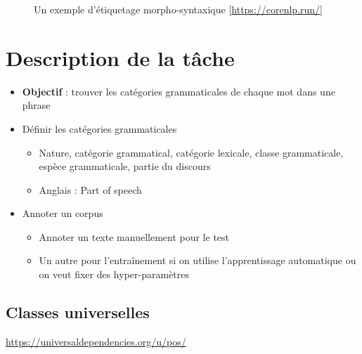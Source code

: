 \documentclass{KodeBook}
\begin{document}
\begin{figure}
	\centering
	\caption{Un exemple d'étiquetage morpho-syntaxique [\url{https://corenlp.run/}]}
\end{figure}

\section{Description de la tâche}

\begin{itemize}
	\item \textbf{Objectif} : trouver les catégories grammaticales de chaque mot dans une phrase
	\item Définir les catégories grammaticales
	\begin{itemize}
		\item Nature, catégorie grammatical, catégorie lexicale, classe grammaticale, espèce grammaticale, partie du discours
		\item Anglais : Part of speech 
	\end{itemize}
	\item Annoter un corpus
	\begin{itemize}
		\item Annoter un texte manuellement pour le test
		\item Un autre pour l'entraînement si on utilise l'apprentissage automatique ou on veut fixer des hyper-paramètres
	\end{itemize}
\end{itemize}

\subsection{Classes universelles}

\url{https://universaldependencies.org/u/pos/}
\end{document}
